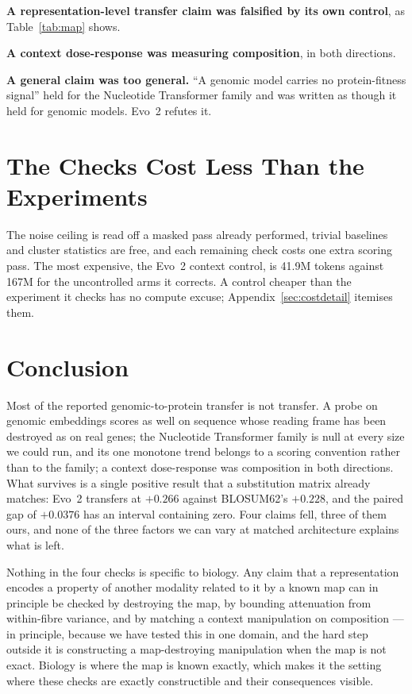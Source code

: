 \documentclass[11pt]{article}
\begin{document}
\textbf{A representation-level transfer claim was falsified by its own control},
as Table~\ref{tab:map} shows.

\textbf{A context dose-response was measuring composition}, in both directions.

\textbf{A general claim was too general.} ``A genomic model carries no
protein-fitness signal'' held for the Nucleotide Transformer family and was written
as though it held for genomic models. Evo~2 refutes it.

\section{The Checks Cost Less Than the Experiments}
\label{sec:cost}

The noise ceiling is read off a masked pass already performed, trivial baselines
and cluster statistics are free, and each remaining check costs one extra scoring
pass. The most expensive, the Evo~2 context control, is 41.9M tokens against 167M
for the uncontrolled arms it corrects. A control cheaper than the experiment it
checks has no compute excuse; Appendix~\ref{sec:costdetail} itemises them.

\section{Conclusion}

Most of the reported genomic-to-protein transfer is not transfer. A probe on
genomic embeddings scores as well on sequence whose reading frame has been
destroyed as on real genes; the Nucleotide Transformer family is null at every
size we could run, and its one monotone trend belongs to a scoring convention
rather than to the family; a context dose-response was composition in both
directions. What survives is a single positive result that a substitution matrix
already matches: Evo~2 transfers at $+0.266$ against BLOSUM62's $+0.228$, and the
paired gap of $+0.0376$ has an interval containing zero. Four claims fell, three of them ours, and none of
the three factors we can vary at matched architecture explains what is left.

Nothing in the four checks is specific to biology. Any claim that a
representation encodes a property of another modality related to it by a known
map can in principle be checked by destroying the map, by bounding attenuation
from within-fibre variance, and by matching a context manipulation on
composition --- in principle, because we have tested this in one domain, and the
hard step outside it is constructing a map-destroying manipulation when the map
is not exact. Biology is where the map is known exactly, which makes it the
setting where these checks are exactly constructible and their consequences
visible.
\end{document}
